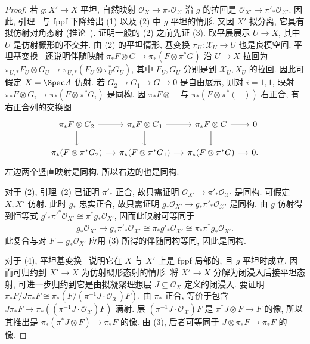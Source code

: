 \begin{proof}
若 $g:X'\to X$ 平坦, 自然映射 $\mathcal O_X\to\pi_*\mathcal O_{\mathcal X}$ 沿 $g$ 的拉回是 $\mathcal O_{X'}\to\pi'_*\mathcal O_{\mathcal X'}$. 因此, 引理~ 与 fppf 下降给出 (1) 以及 (2) 中 $g$ 平坦的情形. 又因 $X'$ 拟分离, 它具有拟仿射对角态射 (推论~). 证明一般的 (2) 之前先证 (3). 取平展展示 $U\to X$, 其中 $U$ 是仿射概形的不交并. 由 (2) 的平坦情形, 基变换 $\pi_U:\mathcal X_U\to U$ 也是良模空间. 平坦基变换~ 还说明伴随映射 $\pi_*F\otimes G\to\pi_*(F\otimes\pi^*G)$ 沿 $U\to X$ 拉回为 $\pi_{U,*}F_U\otimes G_U\to\pi_{U,*}(F_U\otimes\pi_U^*G_U)$, 其中 $F_U,G_U$ 分别是到 $\mathcal X_U,X_U$ 的拉回. 因此可假定 $X=\Spec A$ 仿射. 若 $G_2\to G_1\to G\to0$ 是自由展示, 则对 $i=1,1$, 映射 $\pi_*F\otimes G_i\to\pi_*(F\otimes\pi^*G_i)$ 是同构. 因 $\pi_*F\otimes-$ 与 $\pi_*(F\otimes\pi^*(-))$ 右正合, 有右正合列的交换图
\begin{align*}
\begin{tikzcd}[ampersand replacement=\&,column sep=small]
\pi_*F\otimes G_2\arrow[r]\arrow[d]\&\pi_*F\otimes G_1\arrow[r]\arrow[d]\&\pi_*F\otimes G\arrow[r]\arrow[d]\&0\\
\pi_*(F\otimes\pi^*G_2)\arrow[r]\&\pi_*(F\otimes\pi^*G_1)\arrow[r]\&\pi_*(F\otimes\pi^*G)\arrow[r]\&0.
\end{tikzcd}
\end{align*}
左边两个竖直映射是同构, 所以右边的也是同构.

对于 (2), 引理~(2) 已证明 $\pi'_*$ 正合, 故只需证明 $\mathcal O_{X'}\to\pi'_*\mathcal O_{\mathcal X'}$ 是同构. 可假定 $X,X'$ 仿射. 此时 $g_*$ 忠实正合, 故只需证明 $g_*\mathcal O_{X'}\to g_*\pi'_*\mathcal O_{\mathcal X'}$ 是同构. 由 $g$ 仿射得到恒等式 $g'_*\pi'^*\mathcal O_{X'}\cong\pi^*g_*\mathcal O_{X'}$, 因而此映射可等同于
\begin{align*}
g_*\mathcal O_{X'}\longrightarrow g_*\pi'_*\mathcal O_{\mathcal X'}
\cong\pi_*g'_*\mathcal O_{\mathcal X'}\cong\pi_*\pi^*g_*\mathcal O_{X'}.
\end{align*}
此复合与对 $F=g_*\mathcal O_{X'}$ 应用 (3) 所得的伴随同构等同, 因此是同构.

对于 (4), 平坦基变换~ 说明它在 $X$ 与 $X'$ 上是 fppf 局部的, 且 $g$ 平坦时成立. 因而可归约到 $X'\to X$ 为仿射概形态射的情形. 将 $X'\to X$ 分解为闭浸入后接平坦态射, 可进一步归约到它是由拟凝聚理想层 $J\subseteq\mathcal O_X$ 定义的闭浸入. 要证明 $\pi_*F/J\pi_*F\cong\pi_*(F/(\pi^{-1}J\cdot\mathcal O_{\mathcal X})F)$. 由 $\pi_*$ 正合, 等价于包含 $J\pi_*F\to\pi_*((\pi^{-1}J\cdot\mathcal O_{\mathcal X})F)$ 满射. 层 $(\pi^{-1}J\cdot\mathcal O_{\mathcal X})F$ 是 $\pi^*J\otimes F\to F$ 的像, 所以其推出是 $\pi_*(\pi^*J\otimes F)\to\pi_*F$ 的像. 由 (3), 后者可等同于 $J\otimes\pi_*F\to\pi_*F$ 的像.


\end{proof}
